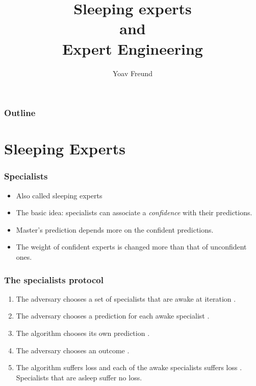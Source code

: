 \documentclass{beamer}
\title{Sleeping experts \\ and \\ Expert Engineering}
\author[Freund] %
{Yoav Freund}
\institute[Universities of Somewhere and Elsewhere] %
\begin{document}

\begin{frame}
  \titlepage
\end{frame}

\begin{frame}
  \frametitle{Outline}
  \tableofcontents[pausesections]
\end{frame}


\section{Sleeping Experts}

\begin{frame}
\frametitle{Specialists}
\begin{itemize}
\item Also called sleeping experts
\item The basic idea: specialists can associate a {\em confidence} with
  their predictions.
\item Master's prediction depends more on the confident predictions.
\item The weight of confident experts is changed more than that of
  unconfident ones.
\end{itemize}
\end{frame}

\begin{frame}
\frametitle{The specialists protocol}

\begin{enumerate}
\item
The adversary chooses a set  of
specialists that are awake at iteration .
\item
The adversary chooses a prediction  for each awake
specialist . 
\item
The algorithm chooses its own prediction .
\item
The adversary chooses an outcome .
\item
The algorithm suffers loss 
and each of the awake specialists suffers loss 
. 
Specialists that are asleep suffer no loss.
\end{enumerate}
\end{frame}
\end{document}
